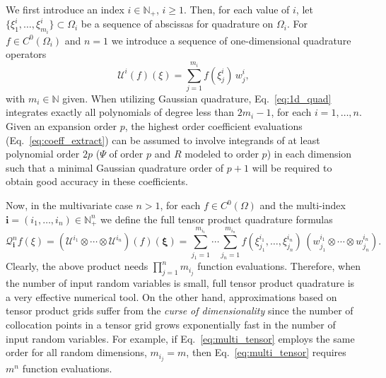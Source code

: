 We first introduce an index $i\in\mathbb{N}_+$, $i\ge1$. Then, for
each value of $i$, let $\{\xi_1^i, \ldots,\xi_{m_i}^i\}\subset \Omega_i$ 
be a sequence of abscissas for quadrature on $\Omega_i$.  For 
$f\in C^0(\Omega_i)$ and $n=1$ we introduce a sequence of
one-dimensional quadrature operators
\begin{equation}\label{eq:1d_quad}
\mathscr{U}^i(f)(\xi)=\sum_{j=1}^{m_i}f(\xi_j^i)\, w^i_j, 
\end{equation}
with $m_i\in\mathbb{N}$ given.  When utilizing Gaussian quadrature,
Eq.~\ref{eq:1d_quad} integrates exactly all polynomials of degree less
than $2m_i -1$, for each $i=1,\ldots, n$.  Given an expansion order
$p$, the highest order coefficient evaluations
(Eq.~\ref{eq:coeff_extract}) can be assumed to involve integrands of
at least polynomial order $2p$ ($\Psi$ of order $p$ and $R$ modeled to
order $p$) in each dimension such that a minimal Gaussian quadrature
order of $p+1$ will be required to obtain good accuracy in these
coefficients.

Now, in the multivariate case $n>1$, for each $f\in C^0(\Omega)$ and
the multi-index $\mathbf{i}=(i_1,\dots,i_n)\in\mathbb{N}_+^n$ we
define the full tensor product quadrature formulas
%
\begin{equation}\label{eq:multi_tensor}
\mathcal{Q}_{\mathbf{i}}^n f(\xi)=\left(\mathscr{U}^{i_1}\otimes\cdots\otimes\mathscr{U}^{i_n}\right)(f)(\boldsymbol{\xi})=
\sum_{j_1=1}^{m_{i_1}}\cdots\sum_{j_n=1}^{m_{i_n}}
f\left(\xi^{i_1}_{j_1},\dots , \xi^{i_n}_{j_n}\right)\,\left(w^{i_1}_{j_1}\otimes\cdots\otimes w^{i_n}_{j_n}\right).
\end{equation}
Clearly, the above product needs $\prod_{j=1}^n m_{i_j}$ function
evaluations.  Therefore, when the number of input random variables is
small, full tensor product quadrature is a very effective numerical
tool.  On the other hand, approximations based on tensor product grids
suffer from the \emph{curse of dimensionality} since the number of
collocation points in a tensor grid grows exponentially fast in the
number of input random variables.  For example, if
Eq.~\ref{eq:multi_tensor} employs the same order for all random dimensions,
$m_{i_j} = m$, then Eq.~\ref{eq:multi_tensor} requires $m^n$ function
evaluations.

